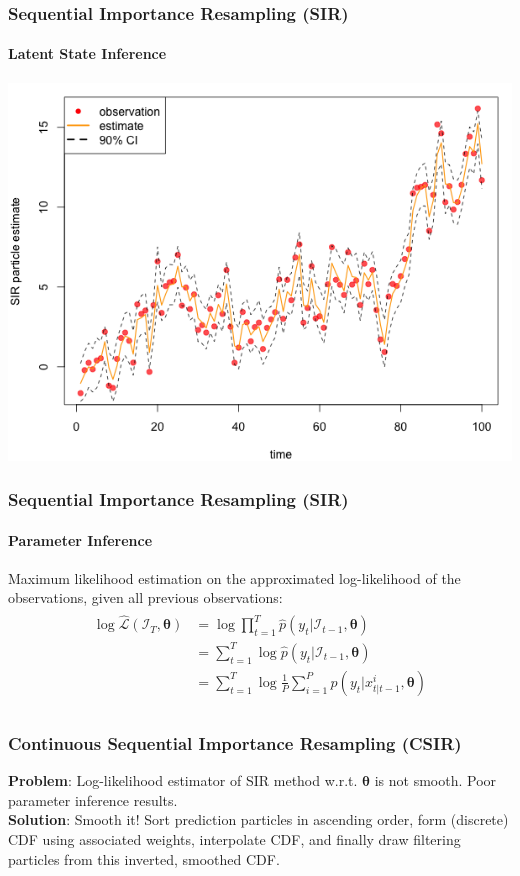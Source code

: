 \documentclass[11pt]{beamer}
\begin{document}
\begin{frame}
\frametitle{Sequential Importance Resampling (SIR)}
\framesubtitle{Latent State Inference}
\centering
\includegraphics[scale=0.45]{ullm-estimate-particle}
\end{frame}

\begin{frame}
\frametitle{Sequential Importance Resampling (SIR)}
\framesubtitle{Parameter Inference}
Maximum likelihood estimation on the approximated log-likelihood of the observations, given all previous observations:
\begin{align*} 
\begin{split}
\log \hat{\mathcal{L}}(\mathcal{I}_T, \boldsymbol{\theta}) &= \log \prod_{t=1}^T \hat{p}(y_t | \mathcal{I}_{t-1}, \boldsymbol{\theta}) \\
&= \sum_{t=1}^T \log \hat{p}(y_t | \mathcal{I}_{t-1}, \boldsymbol{\theta}) \\
&= \sum_{t=1}^T \log \frac{1}{P} \sum_{i=1}^P p(y_t | x_{t | t-1}^i, \boldsymbol{\theta}) \\
\end{split}					
\end{align*} 
\end{frame}

\begin{frame}
\frametitle{Continuous Sequential Importance Resampling (CSIR)}
\textbf{Problem}: Log-likelihood estimator of SIR method w.r.t. $\boldsymbol{\theta}$ is not smooth. Poor parameter inference results.\\
\bigskip
\textbf{Solution}: Smooth it! Sort prediction particles in ascending order, form (discrete) CDF using associated weights, interpolate CDF, and finally draw filtering particles from this inverted, smoothed CDF.
\end{frame}
\end{document}
